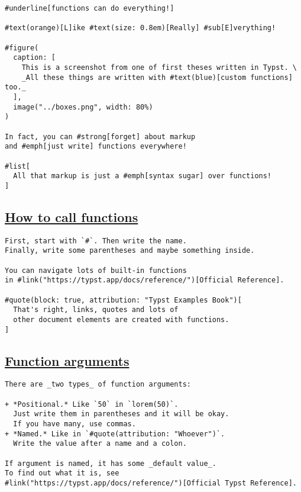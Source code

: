 \begin{verbatim}
#underline[functions can do everything!]

#text(orange)[L]ike #text(size: 0.8em)[Really] #sub[E]verything!

#figure(
  caption: [
    This is a screenshot from one of first theses written in Typst. \
    _All these things are written with #text(blue)[custom functions] too._
  ],
  image("../boxes.png", width: 80%)
)

In fact, you can #strong[forget] about markup
and #emph[just write] functions everywhere!

#list[
  All that markup is just a #emph[syntax sugar] over functions!
]
\end{verbatim}

\pandocbounded{}

\subsection{\texorpdfstring{\hyperref[how-to-call-functions]{How to call
functions}}{How to call functions}}\label{how-to-call-functions}

\begin{verbatim}
First, start with `#`. Then write the name.
Finally, write some parentheses and maybe something inside.

You can navigate lots of built-in functions
in #link("https://typst.app/docs/reference/")[Official Reference].

#quote(block: true, attribution: "Typst Examples Book")[
  That's right, links, quotes and lots of
  other document elements are created with functions.
]
\end{verbatim}

\pandocbounded{}

\subsection{\texorpdfstring{\hyperref[function-arguments]{Function
arguments}}{Function arguments}}\label{function-arguments}

\begin{verbatim}
There are _two types_ of function arguments:

+ *Positional.* Like `50` in `lorem(50)`.
  Just write them in parentheses and it will be okay.
  If you have many, use commas.
+ *Named.* Like in `#quote(attribution: "Whoever")`.
  Write the value after a name and a colon.

If argument is named, it has some _default value_.
To find out what it is, see
#link("https://typst.app/docs/reference/")[Official Typst Reference].
\end{verbatim}

